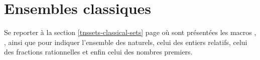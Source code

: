 \documentclass[12pt,a4paper]{article}
\begin{document}
\section{Ensembles classiques}

Se reporter à la section \ref{tnssets-classical-sets} page \pageref{tnssets-classical-sets} où sont présentées les macros , ,  ainsi que  pour indiquer l'ensemble des naturels, celui des entiers relatifs, celui des fractions rationnelles et enfin celui des nombres premiers.
\end{document}
